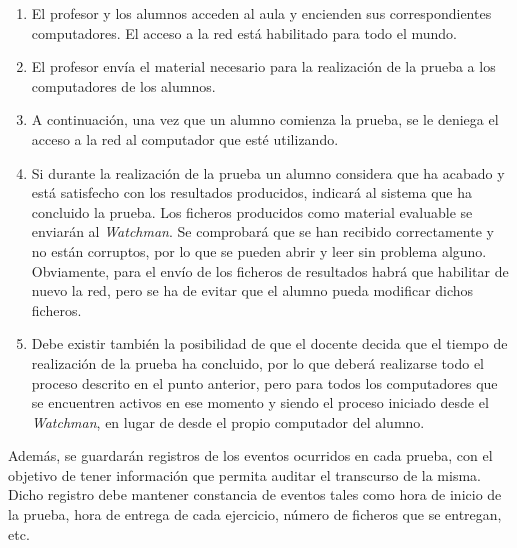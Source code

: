 \begin{enumerate}
	\item El profesor y los alumnos acceden al aula y encienden sus correspondientes computadores. El acceso a la red está habilitado para todo el mundo.
	\item El profesor envía el material necesario para la realización de la prueba a los computadores de los alumnos.
	\item A continuación, una vez que un alumno comienza la prueba, se le deniega el acceso a la red al computador que esté utilizando. %



	\item Si durante la realización de la prueba un alumno considera que ha acabado y está satisfecho con los resultados producidos, indicará al sistema que ha concluido la prueba. Los ficheros producidos como material evaluable se enviarán al \emph{Watchman}. Se comprobará que se han recibido correctamente y no están corruptos, por lo que se pueden abrir y leer sin problema alguno. Obviamente, para el envío de los ficheros de resultados habrá que habilitar de nuevo la red, pero se ha de evitar que el alumno pueda modificar dichos ficheros.
	\item Debe existir también la posibilidad de que el docente decida que el tiempo de realización de la prueba ha concluido, por lo que deberá realizarse todo el proceso descrito en el punto anterior, pero para todos los computadores que se encuentren activos en ese momento y siendo el proceso iniciado desde el \emph{Watchman}, en lugar de desde el propio computador del alumno.
\end{enumerate}


Además, se guardarán registros de los eventos ocurridos en cada prueba, con el objetivo de tener información que permita auditar el transcurso de la misma. Dicho registro debe mantener constancia de eventos tales como hora de inicio de la prueba, hora de entrega de cada ejercicio, número de ficheros que se entregan, etc.
\newline

